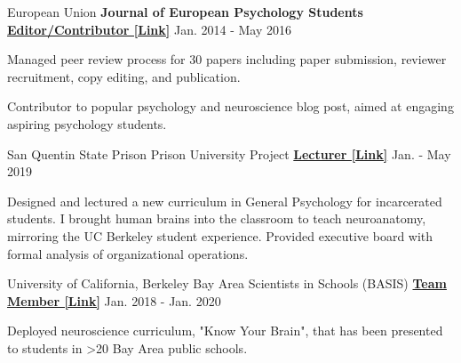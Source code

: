 \begin{cventries}
\begin{cventries}
  \cventry
    {European Union}
    {\textbf{Journal of European Psychology Students}} %
    {\href{https://blog.efpsa.org/2015/09/22/editors-pick-our-favourite-psychology-and-neuroscience-podcasts}{\textbf{Editor/Contributor [Link]}}} %
    {Jan. 2014 - May 2016} %
    {
      \begin{cvitems} %
      	\item {Managed peer review process for 30 papers including paper submission, reviewer recruitment, copy editing, and publication.}
        \item {Contributor to popular psychology and neuroscience blog post, aimed at engaging aspiring psychology students.}
      \end{cvitems}
    }

\end{cventries}
    

\begin{cventries}

  \cventry
    {San Quentin State Prison} %
    {Prison University Project}
    {\href{https://www.neh.gov/about/awards/national-humanities-medals/prison-university-project}{\textbf{Lecturer [Link]}}} %
    {Jan. - May 2019} %
    {
      \begin{cvitems} %
        \item {Designed and lectured a new curriculum in General Psychology for incarcerated students. I brought human brains into the classroom to teach neuroanatomy, mirroring the UC Berkeley student experience. Provided executive board with formal analysis of organizational operations.}
      \end{cvitems}
    }

  \cventry
  	{University of California, Berkeley} %
  	{Bay Area Scientists in Schools (BASIS)}
    {\href{https://docs.google.com/document/d/1EgLHC_wA5ZApCDpqfWc4APGsVKdoymPw/edit?usp=sharing&ouid=110847987931723045299&rtpof=true&sd=true}{\textbf{Team Member [Link]}}} %
    {Jan. 2018 - Jan. 2020} %
    {
      \begin{cvitems} %
        \item {Deployed neuroscience curriculum, "Know Your Brain", that has been presented to students in >20 Bay Area public schools.}
      \end{cvitems}
    }
    

\end{cventries}
\end{cventries}
